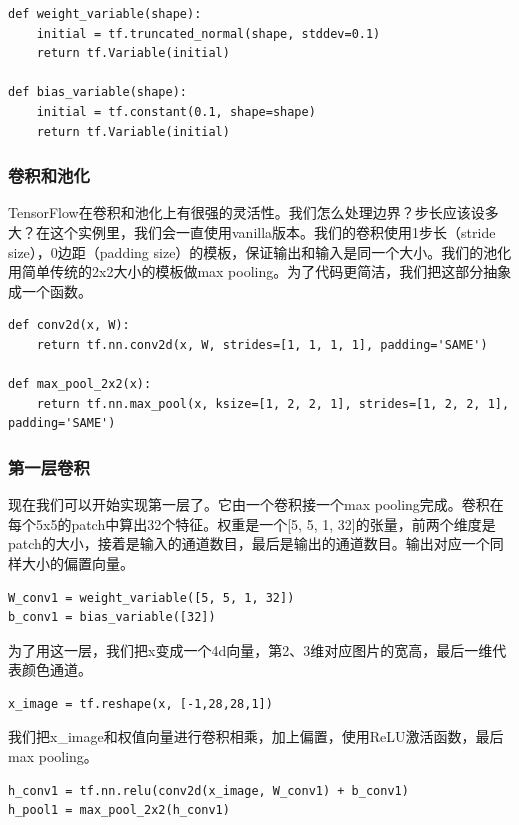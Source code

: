 \documentclass[a4paper,11pt,twoside]{ctexbook}
\begin{document}
\begin{lstlisting}
def weight_variable(shape):
    initial = tf.truncated_normal(shape, stddev=0.1)
    return tf.Variable(initial)

def bias_variable(shape):
    initial = tf.constant(0.1, shape=shape)
    return tf.Variable(initial)
\end{lstlisting}

\subsubsection{卷积和池化}

TensorFlow在卷积和池化上有很强的灵活性。我们怎么处理边界？步长应该设多大？在这个实例里，我们会一直使用vanilla版本。我们的卷积使用1步长（stride size），0边距（padding size）的模板，保证输出和输入是同一个大小。我们的池化用简单传统的2x2大小的模板做max pooling。为了代码更简洁，我们把这部分抽象成一个函数。

\begin{lstlisting}
def conv2d(x, W):
    return tf.nn.conv2d(x, W, strides=[1, 1, 1, 1], padding='SAME')

def max_pool_2x2(x):
    return tf.nn.max_pool(x, ksize=[1, 2, 2, 1], strides=[1, 2, 2, 1], padding='SAME')
\end{lstlisting}

\subsubsection{第一层卷积}

现在我们可以开始实现第一层了。它由一个卷积接一个max pooling完成。卷积在每个5x5的patch中算出32个特征。权重是一个[5, 5, 1, 32]的张量，前两个维度是patch的大小，接着是输入的通道数目，最后是输出的通道数目。输出对应一个同样大小的偏置向量。

\begin{lstlisting}
W_conv1 = weight_variable([5, 5, 1, 32])
b_conv1 = bias_variable([32])
\end{lstlisting}

为了用这一层，我们把x变成一个4d向量，第2、3维对应图片的宽高，最后一维代表颜色通道。

\begin{lstlisting}
x_image = tf.reshape(x, [-1,28,28,1])
\end{lstlisting}

我们把x\_image和权值向量进行卷积相乘，加上偏置，使用ReLU激活函数，最后max pooling。

\begin{lstlisting}
h_conv1 = tf.nn.relu(conv2d(x_image, W_conv1) + b_conv1)
h_pool1 = max_pool_2x2(h_conv1)
\end{lstlisting}
\end{document}
